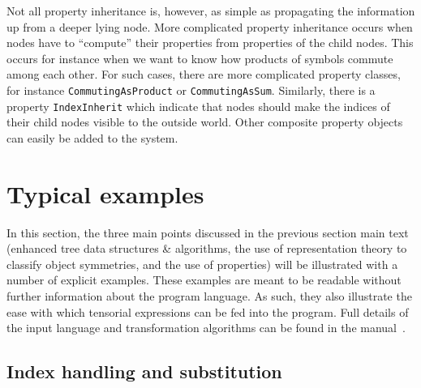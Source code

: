 \documentclass{elsart}
\begin{document}
Not all property inheritance is, however, as simple as propagating the
information up from a deeper lying node. More complicated property
inheritance occurs when nodes have to ``compute'' their properties
from properties of the child nodes. This occurs for instance when we
want to know how products of symbols commute among each other. For
such cases, there are more complicated property classes, for instance
{\tt CommutingAsProduct} or {\tt CommutingAsSum}. Similarly, there is
a property {\tt IndexInherit} which indicate that nodes should make
the indices of their child nodes visible to the outside world. Other
composite property objects can easily be added to the system.


\section{Typical examples}
\label{s:examples}

In this section, the three main points discussed in the previous
section main text (enhanced tree data structures \& algorithms, the
use of representation theory to classify object symmetries, and the
use of properties) will be illustrated with a number of explicit
examples. These examples are meant to be readable without further
information about the program language. As such, they also illustrate
the ease with which tensorial expressions can be fed into the program.
Full details of the input language and transformation algorithms can
be found in the manual~\cite{kas_cdb}.

\subsection{Index handling and substitution}
\end{document}

